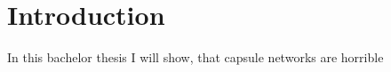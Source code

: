 \section{Introduction}
\label{sec:introduction}
In this bachelor thesis I will show, that capsule networks are horrible